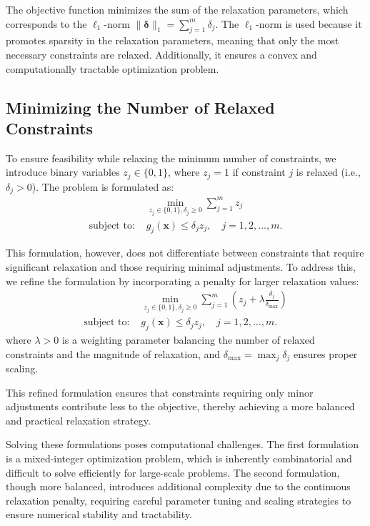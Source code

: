 \documentclass[12pt]{article}
\begin{document}
The objective function minimizes the sum of the relaxation parameters, which corresponds to the $\ell_1$-norm $\|\boldsymbol{\delta}\|_1 = \sum_{j=1}^{m} \delta_j$. The $\ell_1$-norm is used because it promotes sparsity in the relaxation parameters, meaning that only the most necessary constraints are relaxed. Additionally, it ensures a convex and computationally tractable optimization problem.

\subsection{Minimizing the Number of Relaxed Constraints}
To ensure feasibility while relaxing the minimum number of constraints, we introduce binary variables $z_j \in \{0,1\}$, where $z_j = 1$ if constraint $j$ is relaxed (i.e., $\delta_j > 0$). The problem is formulated as:
\begin{align*}
    &\min_{z_j \in \{0,1\}, \delta_j \geq 0} \sum_{j=1}^{m} z_j \\
    \text{subject to: } & g_j(\mathbf{x}) \leq \delta_j z_j, \quad j = 1,2,\dots,m.
\end{align*}

This formulation, however, does not differentiate between constraints that require significant relaxation and those requiring minimal adjustments. To address this, we refine the formulation by incorporating a penalty for larger relaxation values:
\begin{align*}
    &\min_{z_j \in \{0,1\}, \delta_j \geq 0} \sum_{j=1}^{m} \left( z_j + \lambda \frac{\delta_j}{\delta_{\max}} \right) \\
    \text{subject to: } & g_j(\mathbf{x}) \leq \delta_j z_j, \quad j = 1,2,\dots,m.
\end{align*}
where $\lambda > 0$ is a weighting parameter balancing the number of relaxed constraints and the magnitude of relaxation, and $\delta_{\max} = \max_j \delta_j$ ensures proper scaling.

This refined formulation ensures that constraints requiring only minor adjustments contribute less to the objective, thereby achieving a more balanced and practical relaxation strategy.

Solving these formulations poses computational challenges. The first formulation is a mixed-integer optimization problem, which is inherently combinatorial and difficult to solve efficiently for large-scale problems. The second formulation, though more balanced, introduces additional complexity due to the continuous relaxation penalty, requiring careful parameter tuning and scaling strategies to ensure numerical stability and tractability.
\end{document}
